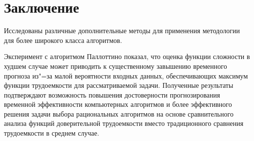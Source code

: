 \documentclass[a4paper, article, 12pt]{extarticle}
\begin{document}
\section{Заключение}\label{sec:summary}

Исследованы различные дополнительные методы для применения методологии~\cite{petrushyn_ulyanov_analysis} для более широкого класса алгоритмов.

Эксперимент с алгоритмом Паллоттино показал, что оценка функции сложности в худшем случае может приводить к существенному завышению временного прогноза из"=за малой вероятности входных данных, обеспечивающих максимум функции трудоемкости для рассматриваемой задачи. Полученные результаты подтверждают возможность повышения достоверности прогнозирования временной эффективности компьютерных алгоритмов и более эффективного решения задачи выбора рациональных алгоритмов на основе сравнительного анализа функций доверительной трудоемкости вместо традиционного сравнения трудоемкости в среднем случае.
\end{document}
